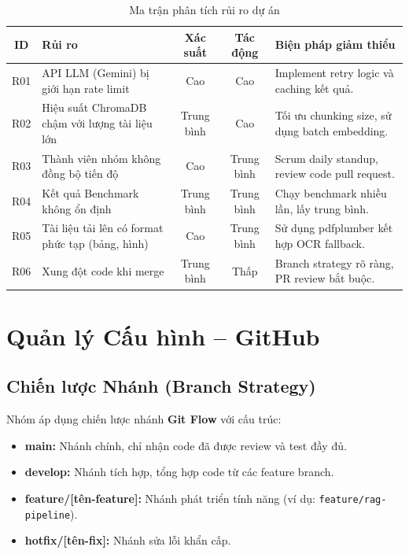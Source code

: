 \begin{table}[H]
  \centering
  \caption{Ma trận phân tích rủi ro dự án}
  \label{tab:risk}
  \renewcommand{\arraystretch}{1.5}
  \begin{tabularx}{\textwidth}{|c|X|c|c|X|}
    \hline
    \rowcolor{blue!10}
    \textbf{ID} & \textbf{Rủi ro} & \textbf{Xác suất} & \textbf{Tác động} & \textbf{Biện pháp giảm thiểu} \\
    \hline
    R01 & API LLM (Gemini) bị giới hạn rate limit & Cao & Cao & Implement retry logic và caching kết quả. \\
    \hline
    R02 & Hiệu suất ChromaDB chậm với lượng tài liệu lớn & Trung bình & Cao & Tối ưu chunking size, sử dụng batch embedding. \\
    \hline
    R03 & Thành viên nhóm không đồng bộ tiến độ & Cao & Trung bình & Scrum daily standup, review code pull request. \\
    \hline
    R04 & Kết quả Benchmark không ổn định & Trung bình & Trung bình & Chạy benchmark nhiều lần, lấy trung bình. \\
    \hline
    R05 & Tài liệu tải lên có format phức tạp (bảng, hình) & Cao & Trung bình & Sử dụng pdfplumber kết hợp OCR fallback. \\
    \hline
    R06 & Xung đột code khi merge & Trung bình & Thấp & Branch strategy rõ ràng, PR review bắt buộc. \\
    \hline
  \end{tabularx}
\end{table}

\section{Quản lý Cấu hình -- GitHub}

\subsection{Chiến lược Nhánh (Branch Strategy)}

Nhóm áp dụng chiến lược nhánh \textbf{Git Flow} với cấu trúc:
\begin{itemize}[itemsep=3pt]
  \item \textbf{main:} Nhánh chính, chỉ nhận code đã được review và test đầy đủ.
  \item \textbf{develop:} Nhánh tích hợp, tổng hợp code từ các feature branch.
  \item \textbf{feature/[tên-feature]:} Nhánh phát triển tính năng (ví dụ: \texttt{feature/rag-pipeline}).
  \item \textbf{hotfix/[tên-fix]:} Nhánh sửa lỗi khẩn cấp.
\end{itemize}

